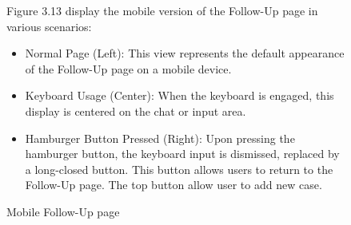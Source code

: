 \documentclass[12pt,oneside,openright,a4paper]{cpe-english-project}
\begin{document}
\begin{figure}[!h]
\begin{minipage}{.15\textwidth}
      \end{minipage}
      \caption{Mobile Follow-Up page}\label{fig:Mob_Follow}
      \begin{flushleft}
        \qquad Figure 3.13 display the mobile version of the Follow-Up page in various scenarios:  \par
        \begin{itemize}
          \item Normal Page (Left): This view represents the default appearance of the Follow-Up page on a mobile device.
          \item Keyboard Usage (Center): When the keyboard is engaged, this display is centered on the chat or input area.
          \item Hamburger Button Pressed (Right): Upon pressing the hamburger button, the keyboard input is dismissed, replaced by a long-closed button. This button allows users to return to the Follow-Up page. The top button allow user to add new case.
        \end{itemize}
      \end{flushleft}
    \end{figure}
\end{document}

